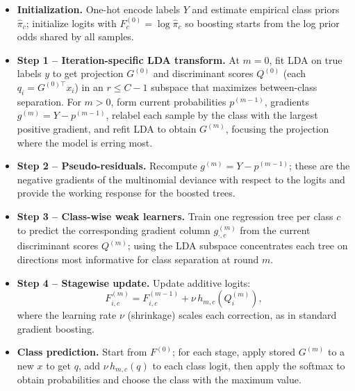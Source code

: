 \documentclass[11pt,a4paper]{article}
\begin{document}
\begin{itemize}
    \item \textbf{Initialization.} One-hot encode labels $Y$ and estimate empirical class priors $\hat{\pi}_c$; initialize logits with $F^{(0)}_c = \log \hat{\pi}_c$ so boosting starts from the log prior odds shared by all samples.

    \item \textbf{Step 1 – Iteration-specific LDA transform.} At $m=0$, fit LDA on true labels $y$ to get projection $G^{(0)}$ and discriminant scores $Q^{(0)}$ (each $q_i = G^{(0)\top} x_i$) in an $r \le C-1$ subspace that maximizes between-class separation.  
    For $m>0$, form current probabilities $p^{(m-1)}$, gradients $g^{(m)} = Y - p^{(m-1)}$, relabel each sample by the class with the largest positive gradient, and refit LDA to obtain $G^{(m)}$, focusing the projection where the model is erring most.

    \item \textbf{Step 2 – Pseudo-residuals.} Recompute $g^{(m)} = Y - p^{(m-1)}$; these are the negative gradients of the multinomial deviance with respect to the logits and provide the working response for the boosted trees.

    \item \textbf{Step 3 – Class-wise weak learners.} Train one regression tree per class $c$ to predict the corresponding gradient column $g^{(m)}_{\cdot,c}$ from the current discriminant scores $Q^{(m)}$; using the LDA subspace concentrates each tree on directions most informative for class separation at round $m$.

    \item \textbf{Step 4 – Stagewise update.} Update additive logits:
    \[
    F^{(m)}_{i,c} = F^{(m-1)}_{i,c} + \nu \, h_{m,c}\left(Q^{(m)}_i\right),
    \]
    where the learning rate $\nu$ (shrinkage) scales each correction, as in standard gradient boosting.

    \item \textbf{Class prediction.} Start from $F^{(0)}$; for each stage, apply stored $G^{(m)}$ to a new $x$ to get $q$, add $\nu \, h_{m,c}(q)$ to each class logit, then apply the softmax to obtain probabilities and choose the class with the maximum value.
\end{itemize}
\end{document}
